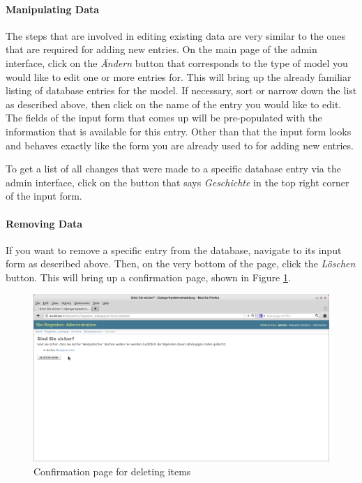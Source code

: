 \paragraph{Manipulating Data}
The steps that are involved in editing existing data are very similar
to the ones that are required for adding new entries. On the main page
of the admin interface, click on the \emph{Ändern} button that
corresponds to the type of model you would like to edit one or more
entries for. This will bring up the already familiar listing of
database entries for the model. If necessary, sort or narrow down the
list as described above, then click on the name of the entry you would
like to edit. The fields of the input form that comes up will be
pre-populated with the information that is available for this entry.
Other than that the input form looks and behaves exactly like the form
you are already used to for adding new entries.

To get a list of all changes that were made to a specific database
entry via the admin interface, click on the button that says
\emph{Geschichte} in the top right corner of the input form.

\paragraph{Removing Data}
If you want to remove a specific entry from the database, navigate to
its input form as described above. Then, on the very bottom of the
page, click the \emph{Löschen} button. This will bring up a
confirmation page, shown in Figure \ref{fig:confirm-delete}.

\begin{figure}[h]
  \centering
  \includegraphics[scale=0.3]{img/confirm-delete}
  \caption{Confirmation page for deleting items}
  \label{fig:confirm-delete}
\end{figure}

